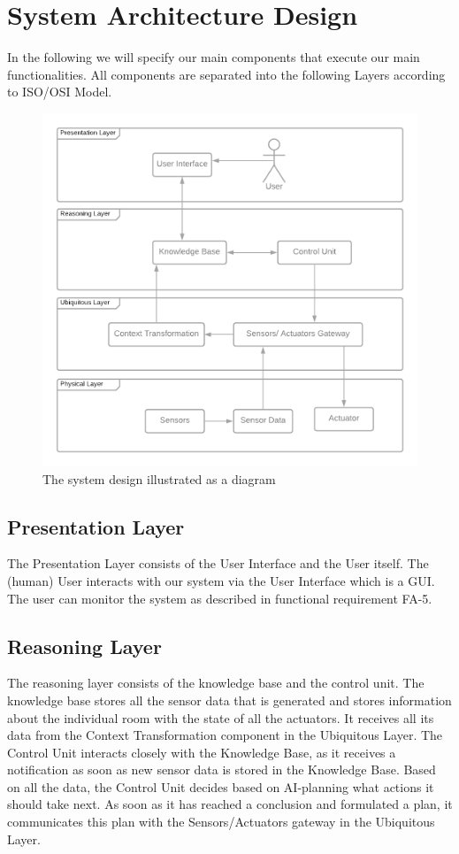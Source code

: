 \section{System Architecture Design}

In the following we will specify our main components that execute our main functionalities. All components are separated into the following Layers according to ISO/OSI Model.

\begin{figure}
    \centering
    \includegraphics[width=\linewidth]{img/system-design.png}
    \caption{The system design illustrated as a diagram}
    \label{fig:system-design}
\end{figure}

\subsection{Presentation Layer}
The Presentation Layer consists of the User Interface and the User itself. The (human) User interacts with our system via the User Interface which is a GUI. The user can monitor the system as described in functional requirement FA-5.

\subsection{Reasoning Layer}
The reasoning layer consists of the knowledge base and the control unit. The knowledge base stores all the sensor data that is generated and stores information about the individual room with the state of all the actuators. It receives all its data from the Context Transformation component in the Ubiquitous Layer. The Control Unit interacts closely with the Knowledge Base, as it receives a notification as soon as new sensor data is stored in the Knowledge Base. Based on all the data, the Control Unit decides based on AI-planning what actions it should take next. As soon as it has reached a conclusion and formulated a plan, it communicates this plan with the Sensors/Actuators gateway in the Ubiquitous Layer.

